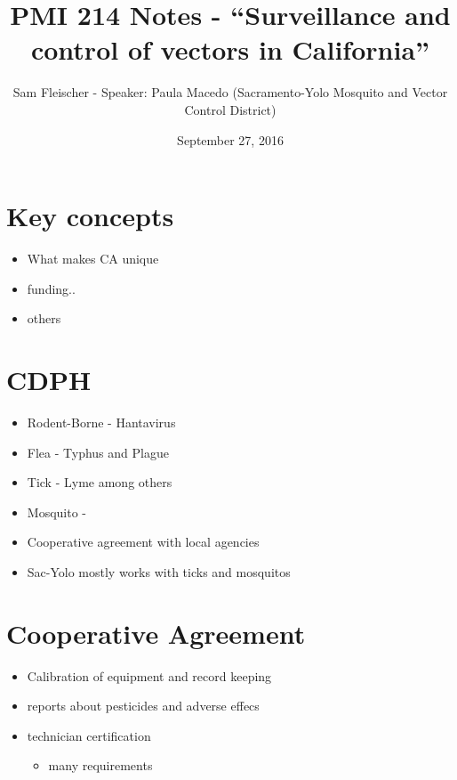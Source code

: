 \documentclass{article}
\title{PMI 214 Notes - ``Surveillance and control of vectors in California''}
\author{Sam Fleischer - Speaker: Paula Macedo (Sacramento-Yolo Mosquito and Vector Control District)}
\date{September 27, 2016}
\begin{document}
    \maketitle

    \section{Key concepts}
        \begin{itemize}
            \item What makes CA unique
            \item funding..
            \item others
        \end{itemize}

    \section{CDPH}
    \begin{itemize}
        \item Rodent-Borne - Hantavirus
        \item Flea - Typhus and Plague
        \item Tick - Lyme among others
        \item Mosquito - 
        \item Cooperative agreement with local agencies

        \item Sac-Yolo mostly works with ticks and mosquitos
    \end{itemize}

    \section{Cooperative Agreement}
    \begin{itemize}
        \item Calibration of equipment and record keeping
        \item reports about pesticides and adverse effecs
        \item technician certification
        \begin{itemize}
            \item many requirements
        \end{itemize}
    \end{itemize}
\end{document}
